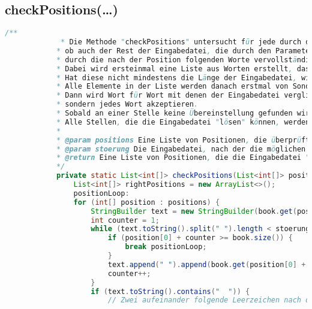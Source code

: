 \documentclass[a4paper, 10pt, ngerman]{scrartcl}
\begin{document}
\subsection{checkPositions(\ldots)}\label{sec:checkPositions()}
\begin{lstlisting}[frame=single, language=Java, title=Methode checkPositions, breaklines=true, label=lst:checkPosition]
			/**
    		 * Die Methode "checkPositions" untersucht für jede durch den Parameter "positions" gegebene Position,
     		* ob auch der Rest der Eingabedatei, die durch den Parameter "stoerung" gegeben ist,
     		* durch die nach der Position folgenden Worte vervollständigt werden kann.
     		* Dabei wird ersteinmal eine Liste aus Worten erstellt, das mit dem durch die Position gegebenen Wort startet.
     		* Hat diese nicht mindestens die Länge der Eingabedatei, wird auch die nächste Zeile hinzugefügt.
     		* Alle Elemente in der Liste werden danach erstmal von Sonderzeichen bereinigt, da diese auch nicht in der Eingabedatei vorgegeben sind.
    		* Dann wird Wort für Wort mit denen der Eingabedatei verglichen, wobei Unterstriche (also Lücken in der Eingabedatei) nicht verglichen werden,
     		* sondern jedes Wort akzeptieren.
     		* Sobald an einer Stelle keine Übereinstellung gefunden wird, wird der Suchvorgang für die eine Position beendet.
     		* Alle Stellen, die die Eingabedatei "lösen" können, werden an eine Liste angefügt, die nach Ende der Methode zurückgegeben wird.
     		*
     		* @param positions Eine Liste von Positionen, die überprüft werden soll
     		* @param stoerung Die Eingabedatei, nach der die möglichen Positionen überprüft werden sollen
     		* @return Eine Liste von Positionen, die die Eingabedatei "lösen" können
     		*/
    		private static List<int[]> checkPositions(List<int[]> positions, List<String> stoerung) {
        		List<int[]> rightPositions = new ArrayList<>();
        		positionLoop:
        		for (int[] position : positions) {
            		StringBuilder text = new StringBuilder(book.get(position[0]).substring(position[1]).toLowerCase());
            		int counter = 1;
            		while (text.toString().split(" ").length < stoerung.size()) {
                		if (position[0] + counter >= book.size()) {
                    		break positionLoop;
                		}
                		text.append(" ").append(book.get(position[0] + counter).toLowerCase());
                		counter++;
           			}
            		if (text.toString().contains("  ")) {
                 		// Zwei aufeinander folgende Leerzeichen nach dem Anfügen eines Leerzeichens an jede Zeile bedeuten, dass hier eine leere Zeile im Buch war.

\end{lstlisting}
\end{document}
